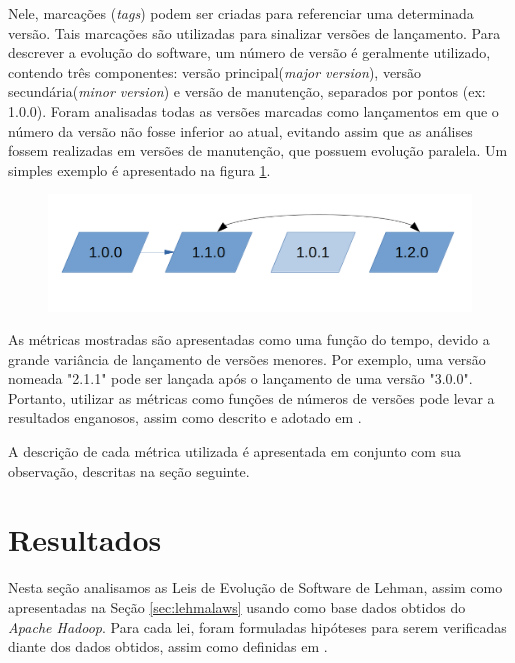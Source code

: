 Nele, marcações (\textit{tags}) podem ser criadas para referenciar uma determinada versão. Tais marcações são utilizadas para sinalizar versões de lançamento. Para descrever a evolução do software, um número de versão é geralmente utilizado, contendo três componentes: versão principal(\textit{major version}), versão secundária(\textit{minor version}) e versão de manutenção, separados por pontos (ex: 1.0.0). Foram analisadas todas as versões marcadas como lançamentos em que o número da versão não fosse inferior ao atual, evitando assim que as análises fossem realizadas em versões de manutenção, que possuem evolução paralela. Um simples exemplo é apresentado na figura \ref{fig:selecaoversoes}.
\begin{figure}[h]
	\centering
	\includegraphics[width=0.7\linewidth]{figure/selecao_versoes}
	\caption{}
	\label{fig:selecaoversoes}
\end{figure}

As métricas mostradas são apresentadas como uma função do tempo, devido a grande variância de lançamento de versões menores. Por exemplo, uma versão nomeada "2.1.1" pode ser lançada após o lançamento de uma versão "3.0.0". Portanto, utilizar as métricas como funções de números de versões pode levar a resultados enganosos, assim como descrito e adotado em \cite{israeli2010linux}.

A descrição de cada métrica utilizada é apresentada em conjunto com sua observação, descritas na seção seguinte.
\section{Resultados} \label{sec:resultados}

Nesta seção analisamos as Leis de Evolução de Software de Lehman, assim como apresentadas na Seção \ref{sec:lehmalaws} usando como base dados obtidos do \textit{Apache Hadoop}. Para cada lei, foram formuladas hipóteses para serem verificadas diante dos dados obtidos, assim como definidas em \cite{neamtiu2013towards}.

